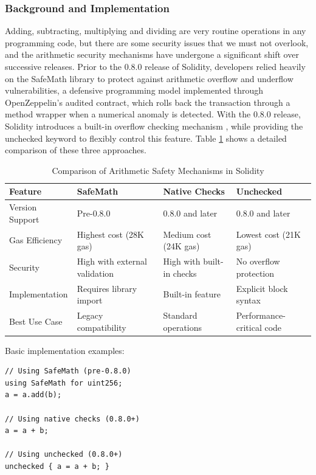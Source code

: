 \documentclass[conference]{IEEEtran}
\begin{document}
\subsubsection{Background and Implementation}

Adding, subtracting, multiplying and dividing are very routine operations in any programming code, but there are some security issues that we must not overlook, and the arithmetic security mechanisms have undergone a significant shift over successive releases. Prior to the 0.8.0 release of Solidity, developers relied heavily on the SafeMath library \cite{openzeppelin} to protect against arithmetic overflow and underflow vulnerabilities, a defensive programming model implemented through OpenZeppelin's audited contract, which rolls back the transaction through a method wrapper when a numerical anomaly is detected. With the 0.8.0 release, Solidity introduces a built-in overflow checking mechanism \cite{solidityArithmetic}, while providing the unchecked keyword to flexibly control this feature. Table \ref{tab:arithmetic-comparison} shows a detailed comparison of these three approaches.

\begin{table}[t]  %
\renewcommand{\arraystretch}{1.2}
\centering  %
\caption{Comparison of Arithmetic Safety Mechanisms in Solidity}
\begin{tabular}{|l|p{5cm}|p{5cm}|p{5cm}|}
\hline
\textbf{Feature} & \textbf{SafeMath} & \textbf{Native Checks} & \textbf{Unchecked} \\
\hline
Version Support & Pre-0.8.0 & 0.8.0 and later & 0.8.0 and later \\
\hline
Gas Efficiency & Highest cost (28K gas) & Medium cost (24K gas) & Lowest cost (21K gas) \\
\hline
Security & High with external validation & High with built-in checks & No overflow protection \\
\hline
Implementation & Requires library import & Built-in feature & Explicit block syntax \\
\hline
Best Use Case & Legacy compatibility & Standard operations & Performance-critical code \\
\hline
\end{tabular}
\label{tab:arithmetic-comparison}
\end{table}

Basic implementation examples:
\begin{lstlisting}[style=solidity]
// Using SafeMath (pre-0.8.0)
using SafeMath for uint256;
a = a.add(b);

// Using native checks (0.8.0+)
a = a + b;

// Using unchecked (0.8.0+)
unchecked { a = a + b; }
\end{lstlisting}
\end{document}
